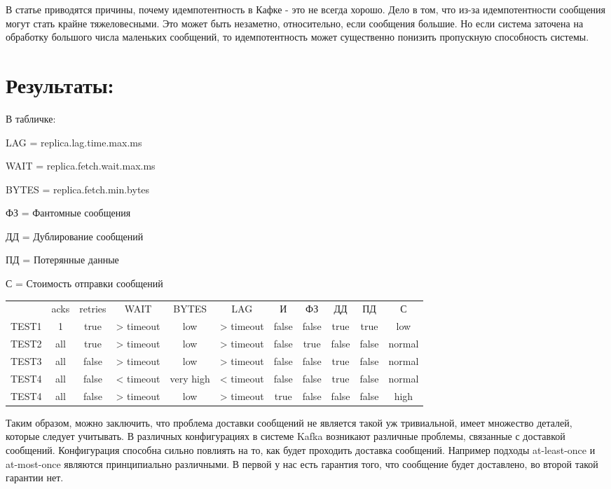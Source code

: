 \documentclass[11pt]{article}
\begin{document}
    В статье\cite{k7} приводятся причины, почему идемпотентность в Кафке - это не всегда хорошо. Дело в том, что
    из-за идемпотентности сообщения могут стать крайне тяжеловесными. Это может быть незаметно, относительно, если
    сообщения большие. Но если система заточена на обработку большого числа маленьких сообщений, то идемпотентность
    может существенно понизить пропускную способность системы.

    \section{Результаты:}
    В табличке:

        LAG = replica.lag.time.max.ms

        WAIT = replica.fetch.wait.max.ms

        BYTES = replica.fetch.min.bytes

        ФЗ = Фантомные сообщения

        ДД = Дублирование сообщений

        ПД = Потерянные данные

        С = Стоимость отправки сообщений

    \begin{center}
        \begin{tabular}{ c c c c c c c c c c c }
                  & acks & retries & WAIT & BYTES & LAG & И &
                  ФЗ & ДД & ПД & С  \\
                  TEST1 & 1 & true & > timeout & low & > timeout & false & false & true & true & low \\
                  TEST2 & all & true & > timeout & low & > timeout & false  & true & false & false & normal \\
                  TEST3 & all & false & > timeout & low & > timeout  & false & false & true & false & normal \\
                  TEST4 & all & false & < timeout & very high & < timeout & false  & false & true & false & normal \\
                  TEST4 & all & false & > timeout & low & > timeout & true  & false & false & false & high \\
        \end{tabular}
    \end{center}

    Таким образом, можно заключить, что проблема доставки сообщений не является такой уж тривиальной, имеет множество
    деталей, которые следует учитывать. В различных конфигурациях в системе Kafka возникают различные проблемы,
    связанные с доставкой сообщений. Конфигурация способна сильно повлиять на то, как будет
    проходить доставка сообщений. Например подходы at-least-once и at-most-once являются принципиально различными. В
    первой у нас есть
    гарантия
    того, что сообщение будет доставлено, во второй такой гарантии нет.
\end{document}
